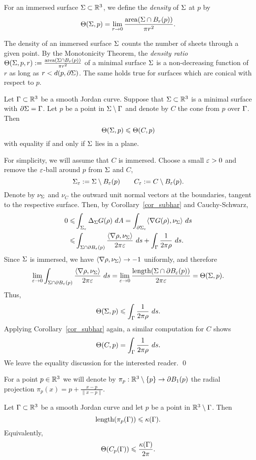 \bdfn
For an immersed surface $\Sigma\subset\mathbb R^3$, we define the {\em density} of $\Sigma$ at $p$ by
\[\Theta(\Sigma,p)=\lim\limits_{r\to 0}\frac{\operatorname{area}(\Sigma\cap B_r(p))}{\pi r^2}.\]
\edfn

The density of an immersed surface $\Sigma$ counts the number of sheets through a given point.
By the Monotonicity Theorem, the {\em density ratio} $\Theta(\Sigma,p,r):=\frac{\operatorname{area}(\Sigma\cap B_r(p))}{\pi r^2}$ of a minimal surface $\Sigma$
is a non-decreasing function of $r$ as long as $r<d(p,\partial\Sigma)$. The same holds true for surfaces which are conical with respect to $p$.

\label{prop_dens_comp}
Let $\Gamma\subset\mathbb R^3$ be a smooth Jordan curve. Suppose that $\Sigma\subset\mathbb R^3$
is a minimal surface with $\partial\Sigma=\Gamma$. Let $p$ be a point in $\Sigma\setminus\Gamma$ and denote by $C$ the
cone from $p$ over $\Gamma$. Then
\[\Theta(\Sigma,p)\leqslant \Theta(C,p)\]
with equality if and only if $\Sigma$ lies in a plane. 
\eprop

\proof
For simplicity, we will assume that $C$ is immersed.
Choose a small $\varepsilon>0$ and remove the $\varepsilon$-ball around $p$ from $\Sigma$ and $C$,
\[\Sigma_\varepsilon:=\Sigma\setminus B_\varepsilon(p) \quad\quad C_\varepsilon:=C\setminus B_\varepsilon(p).\]
Denote by $\nu_\Sigma$ and $\nu_C$ the outward unit normal vectors at the boundaries, tangent to the respective surface.
Then, by Corollary~\ref{cor_subhar} and Cauchy-Schwarz,
\begin{align*}
0\leq&\int_{\Si_\eps}\Delta_\Si G(\rho)\ dA=\int_{\D\Si_\eps}\<\nabla G(\rho),\nu_\Si\>\ ds\\
\leq&\int_{\Si\cap\D B_\eps(p)}\frac{\<\nabla\rho,\nu_\Si\>}{2\pi\eps}\ ds +\int_{\Ga}\frac{1}{2\pi\rho}\ ds.
\end{align*} 
Since $\Sigma$ is immersed, we have $\langle\nabla\rho,\nu_\Sigma\rangle\to-1$ uniformly, and therefore
\[\lim\limits_{\varepsilon\to 0}\int_{\Sigma\cap\partial B_\varepsilon(p)}\frac{\langle\nabla\rho,\nu_\Sigma\rangle}{2\pi\varepsilon}\ ds=
\lim\limits_{\varepsilon\to 0}\frac{\operatorname{length}(\Sigma\cap\partial B_\varepsilon(p))}{2\pi\varepsilon}=\Theta(\Sigma,p).
\]
Thus,
\[\Theta(\Si,p)\leq \int_{\Ga}\frac{1}{2\pi\rho}\ ds.\]
Applying Corollary~\ref{cor_subhar} again, a similar computation for $C$ shows
\[\Theta(C,p)= \int_{\Gamma}\frac{1}{2\pi\rho}\ ds.\]
We leave the equality discussion for the interested reader.
\qed
\medskip

For a point $p\in\mathbb R^3$ we will denote by $\pi_p:\mathbb R^3\setminus\{p\}\to\partial B_1(p)$
the radial projection $\pi_p(x)=p+\frac{x-p}{\|x-p\|}$.

\bprop\label{prop_dens_est}
Let $\Gamma\subset\mathbb R^3$ be a smooth Jordan curve and let $p$
be a point in $\mathbb R^3\setminus\Gamma$. Then
\[\operatorname{length}(\pi_p(\Gamma))\leqslant\kappa(\Gamma).\]
Equivalently,
\[\Theta(C_p(\Gamma))\leqslant\frac{\kappa(\Gamma)}{2\pi}.\]
\eprop

